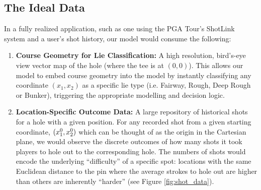 \documentclass[11pt, letterpaper]{article}
\begin{document}
\subsection{The Ideal Data} 
\label{ref:idealData}
In a fully realized application, such as one using the PGA Tour's ShotLink system and a user's shot history, our model would consume the following:
\begin{enumerate}
    \item \textbf{Course Geometry for Lie Classification:} A high resolution, bird's-eye view vector map of the hole (where the tee is at $(0,0)$). This allows our model to embed course geometry into the model by instantly classifying any coordinate $(x_1,x_2)$ as a specific lie type (i.e. Fairway, Rough, Deep Rough or Bunker), triggering the appropriate modelling and decision logic.
    \item \textbf{Location-Specific Outcome Data:} A large repository of historical shots for a hole with a given position. For any recorded shot from a given starting coordinate, $(x_1^0,x_2^0)$ which can be thought of as the origin in the Cartesian plane, we would observe the discrete outcomes of how many shots it took players to hole out to the corresponding hole. The numbers of shots would encode the underlying ``difficulty'' of a specific spot: locations with the same Euclidean distance to the pin where the average strokes to hole out are higher than others are inherently ``harder'' (see Figure \ref{fig:shot_data}).


\end{enumerate}
\end{document}
